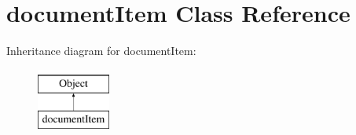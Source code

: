 \hypertarget{classdocumentItem}{\section{document\-Item Class Reference}
\label{classdocumentItem}
}
Inheritance diagram for document\-Item\-:\begin{figure}[H]
\begin{center}
\leavevmode
\includegraphics[height=2.000000cm]{classdocumentItem}
\end{center}
\end{figure}
